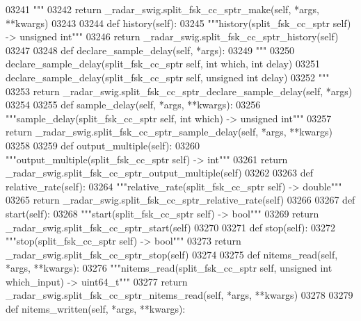 \begin{DoxyCode}
{{{{{{{{{{{{03241 \textcolor{stringliteral}{        """}
03242         \textcolor{keywordflow}{return} \_radar\_swig.split\_fsk\_cc\_sptr\_make(self, *args, **kwargs)
03243 
03244     \textcolor{keyword}{def }history(self):
03245         \textcolor{stringliteral}{"""history(split\_fsk\_cc\_sptr self) -> unsigned int"""}
03246         \textcolor{keywordflow}{return} \_radar\_swig.split\_fsk\_cc\_sptr\_history(self)
03247 
03248     \textcolor{keyword}{def }declare_sample_delay(self, *args):
03249         \textcolor{stringliteral}{"""}
03250 \textcolor{stringliteral}{        declare\_sample\_delay(split\_fsk\_cc\_sptr self, int which, int delay)}
03251 \textcolor{stringliteral}{        declare\_sample\_delay(split\_fsk\_cc\_sptr self, unsigned int delay)}
03252 \textcolor{stringliteral}{        """}
03253         \textcolor{keywordflow}{return} \_radar\_swig.split\_fsk\_cc\_sptr\_declare\_sample\_delay(self, *args)
03254 
03255     \textcolor{keyword}{def }sample_delay(self, *args, **kwargs):
03256         \textcolor{stringliteral}{"""sample\_delay(split\_fsk\_cc\_sptr self, int which) -> unsigned int"""}
03257         \textcolor{keywordflow}{return} \_radar\_swig.split\_fsk\_cc\_sptr\_sample\_delay(self, *args, **kwargs)
03258 
03259     \textcolor{keyword}{def }output_multiple(self):
03260         \textcolor{stringliteral}{"""output\_multiple(split\_fsk\_cc\_sptr self) -> int"""}
03261         \textcolor{keywordflow}{return} \_radar\_swig.split\_fsk\_cc\_sptr\_output\_multiple(self)
03262 
03263     \textcolor{keyword}{def }relative_rate(self):
03264         \textcolor{stringliteral}{"""relative\_rate(split\_fsk\_cc\_sptr self) -> double"""}
03265         \textcolor{keywordflow}{return} \_radar\_swig.split\_fsk\_cc\_sptr\_relative\_rate(self)
03266 
03267     \textcolor{keyword}{def }start(self):
03268         \textcolor{stringliteral}{"""start(split\_fsk\_cc\_sptr self) -> bool"""}
03269         \textcolor{keywordflow}{return} \_radar\_swig.split\_fsk\_cc\_sptr\_start(self)
03270 
03271     \textcolor{keyword}{def }stop(self):
03272         \textcolor{stringliteral}{"""stop(split\_fsk\_cc\_sptr self) -> bool"""}
03273         \textcolor{keywordflow}{return} \_radar\_swig.split\_fsk\_cc\_sptr\_stop(self)
03274 
03275     \textcolor{keyword}{def }nitems_read(self, *args, **kwargs):
03276         \textcolor{stringliteral}{"""nitems\_read(split\_fsk\_cc\_sptr self, unsigned int which\_input) -> uint64\_t"""}
03277         \textcolor{keywordflow}{return} \_radar\_swig.split\_fsk\_cc\_sptr\_nitems\_read(self, *args, **kwargs)
03278 
03279     \textcolor{keyword}{def }nitems_written(self, *args, **kwargs):
}}}}}}}}}}}}
\end{DoxyCode}
